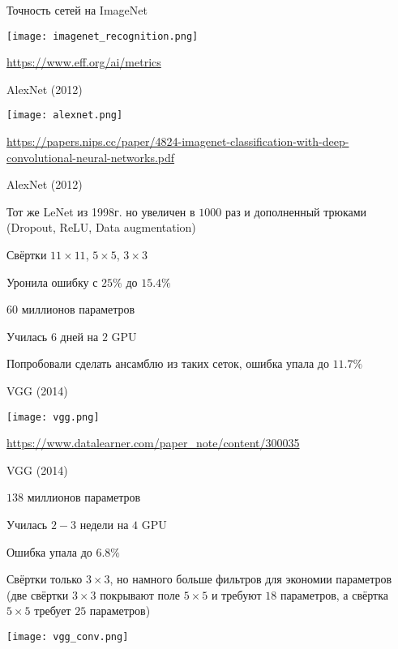 \documentclass[notes,12pt, aspectratio=169]{beamer}
\newenvironment{wideitemize}{\itemize\addtolength{\itemsep}{10pt}}{\enditemize}
\begin{document}
\begin{frame}{Точность сетей на ImageNet}
\begin{center}
	\texttt{[image: imagenet\_recognition.png]}
\end{center}
\vfill %
\footnotesize
\color{blue} \url{https://www.eff.org/ai/metrics}
\end{frame} 


\begin{frame}{AlexNet (2012)}
\begin{center}
\texttt{[image: alexnet.png]}
\end{center}
\vfill %
\tiny
\color{blue} \url{https://papers.nips.cc/paper/4824-imagenet-classification-with-deep-convolutional-neural-networks.pdf}
\end{frame}


\begin{frame}{AlexNet (2012)}
\begin{wideitemize}
	\item Тот же LeNet из 1998г. но увеличен в $1000$ раз и дополненный трюками (Dropout, ReLU, Data augmentation) 
	\item Свёртки $11 \times 11$, $5 \times 5$, $3 \times 3$
	\item  Уронила ошибку с $25\%$ до $15.4\%$ 
	\item  $60$ миллионов параметров 
	\item  Училась $6$ дней на $2$ GPU 
	\item Попробовали сделать ансамблю из таких сеток, ошибка упала до $11.7\%$
\end{wideitemize}
\end{frame}


\begin{frame}{VGG (2014)}
\begin{center}
	\texttt{[image: vgg.png]}
\end{center}
\vfill %
\footnotesize
\color{blue} \url{https://www.datalearner.com/paper_note/content/300035}
\end{frame}


\begin{frame}{VGG (2014)}
\begin{wideitemize}
	\item  $138$ миллионов параметров
	\item  Училась $2-3$ недели на $4$ GPU 
	\item Ошибка упала до $6.8\%$
	\item Свёртки только $3 \times 3$, но намного больше фильтров для экономии параметров (две свёртки $3\times 3$ покрывают поле $5 \times 5$ и требуют $18$ параметров, а свёртка $5 \times 5$ требует $25$ параметров)
	\begin{center}
		\texttt{[image: vgg\_conv.png]}
	\end{center}
\end{wideitemize}
\end{frame}
\end{document}
